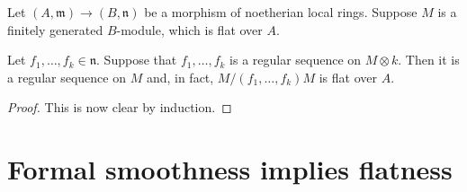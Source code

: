 \begin{corollary} Let $(A, \mathfrak{m}) \to (B, \mathfrak{n})$ be a morphism
of noetherian local rings.
Suppose $M$ is a finitely generated $B$-module, which is flat over $A$.

Let $f_1, \dots, f_k \in \mathfrak{n}$. Suppose that $f_1, \dots, f_k$ is a
regular sequence on $M \otimes k$. Then it is a regular sequence on $M$ and,
in fact, $M/(f_1, \dots, f_k ) M$ is flat over $A$.
\end{corollary} 
\begin{proof} 
This is now clear by induction. 
\end{proof} 
\section{Formal smoothness implies flatness}

